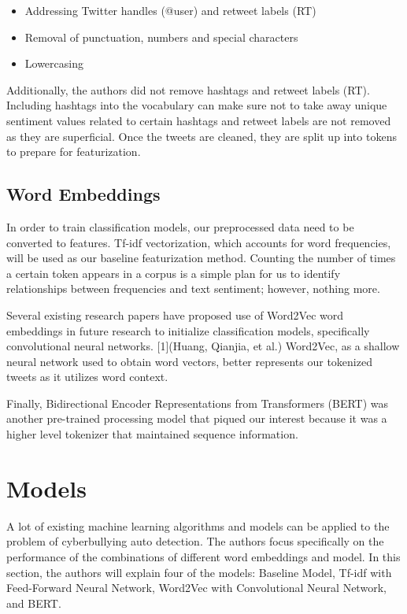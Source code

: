 \documentclass[conference]{IEEEtran}
\begin{document}
\begin{itemize}
\item Addressing Twitter handles (@user) and retweet labels (RT)

\item Removal of punctuation, numbers and special characters

\item Lowercasing
\end{itemize}

Additionally, the authors did not remove hashtags and retweet labels (RT). Including hashtags into the vocabulary can make sure not to take away unique sentiment values related to certain hashtags and  retweet labels are not removed as they are superficial. Once the tweets are cleaned, they are split up into tokens to prepare for featurization.


\subsection{Word Embeddings}

In order to train classification models, our preprocessed data need to be converted to features. Tf-idf vectorization, which accounts for word frequencies, will be used as our baseline featurization method. Counting the number of times a certain token appears in a corpus is a simple plan for us to identify relationships between frequencies and text sentiment; however, nothing more.

	Several existing research papers have proposed use of Word2Vec word embeddings in future research to initialize classification models, specifically convolutional neural networks. [1](Huang, Qianjia, et al.) Word2Vec, as a shallow neural network used to obtain word vectors, better represents our tokenized tweets as it utilizes word context. 

	Finally, Bidirectional Encoder Representations from Transformers (BERT) was another pre-trained processing model that piqued our interest because it was a higher level tokenizer that maintained sequence information.



\section{Models}
A lot of existing machine learning algorithms and models can be applied to the problem of cyberbullying auto detection. The authors focus specifically on the performance of the combinations of different word embeddings and model. In this section, the authors will explain four of the models: Baseline Model, Tf-idf with Feed-Forward Neural Network, Word2Vec with Convolutional Neural Network, and BERT.
\end{document}
